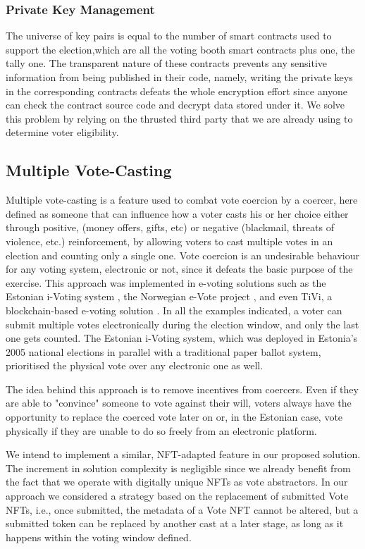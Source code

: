 \documentclass[../main.tex]{subfiles}
\begin{document}
    \subsubsection{Private Key Management}
        The universe of key pairs is equal to the number of smart contracts used to support the election,which are all the voting booth smart contracts plus one, the tally one. The transparent nature of these contracts prevents any sensitive information from being published in their code, namely, writing the private keys in the corresponding contracts defeats the whole encryption effort since anyone can check the contract source code and decrypt data stored under it. We solve this problem by relying on the thrusted third party that we are already using to determine voter eligibility.

    \subsection{Multiple Vote-Casting}
        \label{multiple_vote_casting}
        Multiple vote-casting is a feature used to combat vote coercion by a coercer, here defined as someone that can influence how a voter casts his or her choice either through positive, (money offers, gifts, etc) or negative (blackmail, threats of violence, etc.) reinforcement, by allowing voters to cast multiple votes in an election and counting only a single one. Vote coercion is an undesirable behaviour for any voting system, electronic or not, since it defeats the basic purpose of the exercise. This approach was implemented in e-voting solutions such as the Estonian i-Voting system \cite{Madise2006}, the Norwegian e-Vote project \cite{Barrat2012}, and even TiVi, a blockchain-based e-voting solution \cite{TiVi2021}. In all the examples indicated, a voter can submit multiple votes electronically during the election window, and only the last one gets counted. The Estonian i-Voting system, which was deployed in Estonia's 2005 national elections in parallel with a traditional paper ballot system, prioritised the physical vote over any electronic one as well.
        \par
        The idea behind this approach is to remove incentives from coercers. Even if they are able to "convince" someone to vote against their will, voters always have the opportunity to replace the coerced vote later on or, in the Estonian case, vote physically if they are unable to do so freely from an electronic platform.
        \par
        We intend to implement a similar, NFT-adapted feature in our proposed solution. The increment in solution complexity is negligible since we already benefit from the fact that we operate with digitally unique NFTs as vote abstractors. In our approach we considered a strategy based on the replacement of submitted Vote NFTs, i.e., once submitted, the metadata of a Vote NFT cannot be altered, but a submitted token can be replaced by another cast at a later stage, as long as it happens within the voting window defined.
\end{document}
